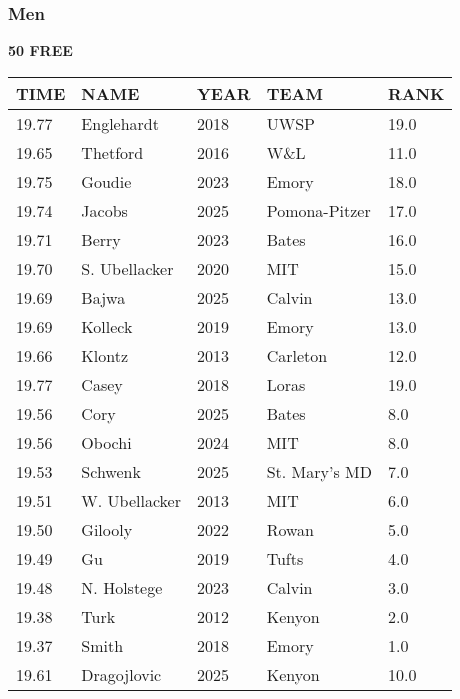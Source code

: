 \subsubsection{Men}

\begin{minipage}[t]{0.48\textwidth}
\centering
\textbf{50 FREE}\\[0.05cm]
\begin{tabular}{@{}p{1.8cm}p{2.8cm}p{1.2cm}p{1.4cm}p{0.8cm}@{}}
\hline
\textbf{TIME} & \textbf{NAME} & \textbf{YEAR} & \textbf{TEAM} & \textbf{RANK} \\
\hline
19.77 & Englehardt & 2018 & UWSP & 19.0 \\
19.65 & Thetford & 2016 & W\&L & 11.0 \\
19.75 & Goudie & 2023 & Emory & 18.0 \\
19.74 & Jacobs & 2025 & Pomona-Pitzer & 17.0 \\
19.71 & Berry & 2023 & Bates & 16.0 \\
19.70 & S. Ubellacker & 2020 & MIT & 15.0 \\
19.69 & Bajwa & 2025 & Calvin & 13.0 \\
19.69 & Kolleck & 2019 & Emory & 13.0 \\
19.66 & Klontz & 2013 & Carleton & 12.0 \\
19.77 & Casey & 2018 & Loras & 19.0 \\
19.56 & Cory & 2025 & Bates & 8.0 \\
19.56 & Obochi & 2024 & MIT & 8.0 \\
19.53 & Schwenk & 2025 & St. Mary's MD & 7.0 \\
19.51 & W. Ubellacker & 2013 & MIT & 6.0 \\
19.50 & Gilooly & 2022 & Rowan & 5.0 \\
19.49 & Gu & 2019 & Tufts & 4.0 \\
19.48 & N. Holstege & 2023 & Calvin & 3.0 \\
19.38 & Turk & 2012 & Kenyon & 2.0 \\
19.37 & Smith & 2018 & Emory & 1.0 \\
19.61 & Dragojlovic & 2025 & Kenyon & 10.0 \\
\hline
\end{tabular}
\end{minipage}\hfill
